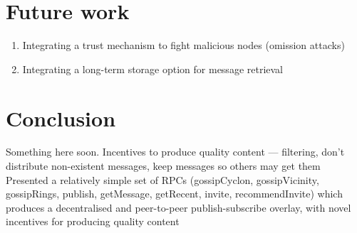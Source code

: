 \documentclass[10pt,a4paper,onecolumn]{article}
\begin{document}


\section{Future work}
\begin{enumerate}
\list Spam prevention using Bayesian filters (fights individuals) and Hashcash (fights spam farms)
\item Integrating a trust mechanism to fight malicious nodes (omission attacks)
\item Integrating a long-term storage option for message retrieval
\end{enumerate}

\section{Conclusion}
Something here soon.
Incentives to produce quality content — filtering, don't distribute non-existent messages, keep messages so others may get them
Presented a relatively simple set of RPCs (gossipCyclon, gossipVicinity, gossipRings, publish, getMessage, getRecent, invite, recommendInvite) which produces a decentralised and peer-to-peer publish-subscribe overlay, with novel incentives for producing quality content

{}

\end{document}
